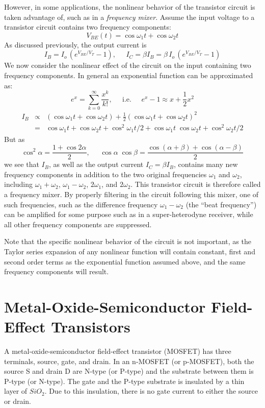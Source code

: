 \begin{itemize}
However, in some applications, the nonlinear behavior of the transistor circuit 
is taken advantage of, such as in a {\em frequency mixer}. Assume the input voltage
to a transistor circuit contains two frequency components:
\[
V_{BE}(t)=\cos\omega_1t+\cos\omega_2t 
\]
As discussed previously, the output current is
\[
I_B=I_o\, (e^{V_{BE}/V_T}-1),\;\;\;\;\;
I_C=\beta I_B=\beta\, I_o\, (e^{V_{BE}/V_T}-1) 
\]
We now consider the nonlinear effect of the circuit on the input containing two
frequency components. In general an exponential function can be approximated as:
\[
e^x=\sum_{k=0}^\infty \frac{x^k}{k!},\;\;\;\;\;\mbox{i.e.}\;\;\;\;\;
e^x-1 \approx x+\frac{1}{2} x^2 
\]
\begin{eqnarray} 
I_B &\propto& (\cos\omega_1t+\cos\omega_2t) +\frac{1}{2}(\cos\omega_1t+\cos\omega_2t)^2 
\nonumber \\
&=&\cos\omega_1t+\cos\omega_2t+\cos^2\omega_1t/2+\cos\omega_1t\;\cos\omega_2t +\cos^2\omega_2t/2  
\nonumber
\end{eqnarray}
But as 
\[ 
\cos^2\alpha=\frac{1+\cos 2\alpha}{2},\;\;\;\;\;
\cos\alpha\;\cos\beta=\frac{\cos(\alpha+\beta)+\cos(\alpha-\beta)}{2} 
\]
we see that $I_B$, as well as the output current $I_C=\beta I_B$, contains
many new frequency components in addition to the two original frequencies
$\omega_1$ and $\omega_2$, including $\omega_1+\omega_2$, $\omega_1-\omega_2$,
$2\omega_1$, and $2\omega_2$. This transistor circuit is therefore called a 
frequency mixer. By properly filtering in the circuit following this mixer, 
one of such frequencies, such as the difference frequency $\omega_1-\omega_2$ 
(the ``beat frequency'') can be amplified for some purpose such as in a 
super-heterodyne receiver, while all other frequency components are suppressed.

Note that the specific nonlinear behavior of the circuit is not important, as the
Taylor series expansion of any nonlinear function will contain constant, first 
and second order terms as the exponential function assumed above, and the same
frequency components will result.

\end{itemize}

\section*{Metal-Oxide-Semiconductor Field-Effect Transistors}

A metal-oxide-semiconductor field-effect transistor (MOSFET) has three terminals,
source, gate, and drain. In an n-MOSFET (or p-MOSFET), both the source S and drain
D are N-type (or P-type) and the substrate between them is P-type (or N-type). 
The gate and the P-type substrate is insulated by a thin layer of $SiO_2$. Due 
to this insulation, there is no gate current to either the source or drain.

